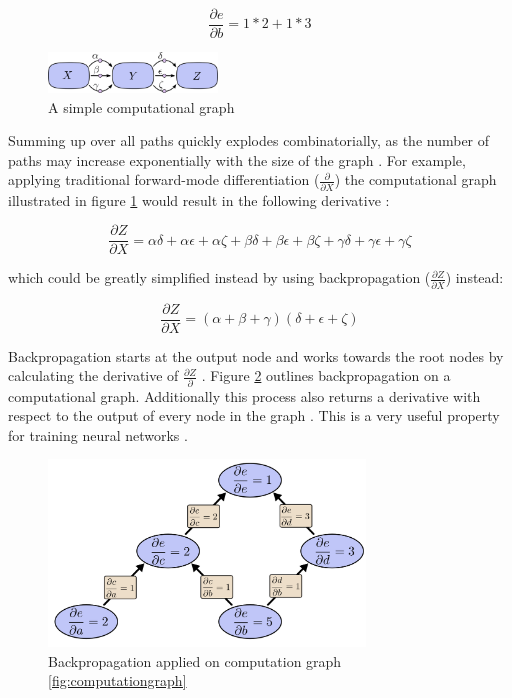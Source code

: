 \documentclass[draft,final,oneside]{vutinfth} %
\begin{document}
\begin{equation}
\frac{\partial e}{\partial b} = 1 * 2 + 1  * 3
\end{equation}

\begin{figure}[ht]
	\centering
  	\includegraphics[width=0.4\textwidth]{graphics/computationgraphsimple.png}
	\caption{A simple computational graph \cite{colahbackprop}}
	\label{fig:computationgraphsimple}
\end{figure}

Summing up over all paths quickly explodes combinatorially, as the number of paths may increase exponentially with the size of the graph \cite{colahbackprop}. For example, applying traditional forward-mode differentiation ($\frac{\partial}{\partial X}$) the computational graph illustrated in figure \ref{fig:computationgraphsimple} would result in the following derivative \cite{colahbackprop}:

\begin{equation}
\frac{\partial Z}{\partial X} = \alpha \delta + \alpha \epsilon + \alpha \zeta + \beta \delta + \beta \epsilon + \beta \zeta + \gamma \delta + \gamma \epsilon + \gamma \zeta
\end{equation}

which could be greatly simplified instead by using backpropagation ($\frac{\partial Z}{\partial X}$) instead:

\begin{equation}
\frac{\partial Z}{\partial X} = (\alpha + \beta + \gamma)(\delta + \epsilon + \zeta)
\end{equation}

Backpropagation starts at the output node and works towards the root nodes by calculating the derivative of $\frac{\partial Z}{\partial}$ \cite{colahbackprop}. Figure \ref{fig:computationgraphreverse} outlines backpropagation on a computational graph. Additionally this process also returns a derivative with respect to the output of every node in the graph \cite{Goodfellow-et-al-2016}. This is a very useful property for training neural networks \cite{Goodfellow-et-al-2016}.

\begin{figure}[ht]
	\centering
  	\includegraphics[width=0.75\textwidth]{graphics/computationgraphreverse.png}
	\caption{Backpropagation applied on computation graph \ref{fig:computationgraph} \cite{colahbackprop}}
	\label{fig:computationgraphreverse}
\end{figure}
\end{document}
